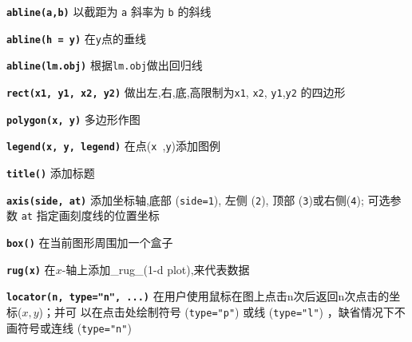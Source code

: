 \documentclass[landscape]{article}
\newcommand{\code}{\texttt}
\newcommand{\bcode}[1]{\texttt{\textbf{#1}}}
\begin{document}
\begin{multicols*}{3}
\bcode{abline(a,b)} 以截距为 \code{a} 斜率为 \code{b} 的斜线

\bcode{abline(h = y)} 在\code{y}点的垂线


\bcode{abline(lm.obj)}  根据\code{lm.obj}做出回归线


\bcode{rect(x1, y1, x2, y2)}    做出左,右,底,高限制为\code{x1}, \code{x2}, \code{y1},\code{y2} 的四边形

\bcode{polygon(x, y)}   多边形作图

\bcode{legend(x, y, legend)}    在点(\code{x}~,\code{y})添加图例

\bcode{title()} 添加标题

\bcode{axis(side, at)}  添加坐标轴,底部 (\code{side=1}), 左侧 (\code{2}), 顶部 (\code{3})或右侧(\code{4});
可选参数 \code{at} 指定画刻度线的位置坐标

\bcode{box()}  在当前图形周围加一个盒子

\bcode{rug(x)}  在$x$-轴上添加\_rug\_(1-d plot),来代表数据

\bcode{locator(n, type="n", ...)}  在用户使用鼠标在图上点击n次后返回n次点击的坐标($x,y$)；并可
以在点击处绘制符号 (\code{type="p"}) 或线 (\code{type="l"}) ，缺省情况下不画符号或连线 (\code{type="n"})



\end{multicols*}
\end{document}
